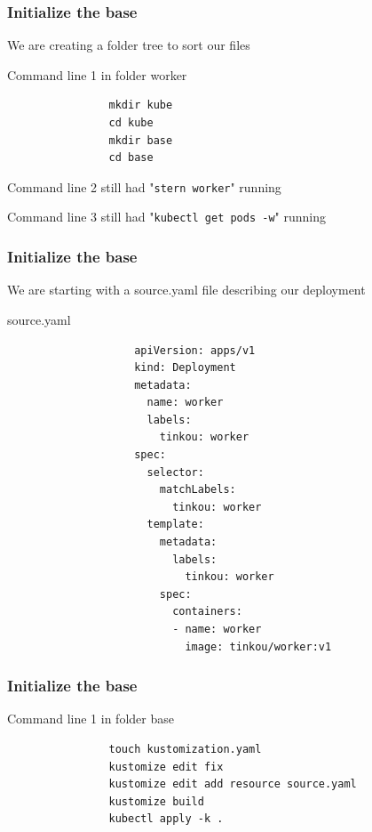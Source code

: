 	\begin{frame}[fragile]
		\frametitle{Initialize the base}
		
		We are creating a folder tree to sort our files
		\begin{block}{Command line 1 in folder worker}
			\begin{verbatim}
				mkdir kube
				cd kube
				mkdir base
				cd base
			\end{verbatim}
		\end{block}
		
		\bigskip
		
		\begin{footnotesize}
			Command line 2 still had "\verb!stern worker!" running
			
			Command line 3 still had "\verb!kubectl get pods -w!" running
		\end{footnotesize}
	\end{frame}
	
	\begin{frame}[fragile]
		\frametitle{Initialize the base}
		
		We are starting with a source.yaml file describing our deployment
		\begin{block}{source.yaml}
			\begin{tiny}
				\begin{verbatim}
					apiVersion: apps/v1
					kind: Deployment
					metadata:
					  name: worker
					  labels:
					    tinkou: worker
					spec:
					  selector:
					    matchLabels:
					      tinkou: worker
					  template:
					    metadata:
					      labels:
					        tinkou: worker
					    spec:
					      containers:
					      - name: worker
					        image: tinkou/worker:v1
				\end{verbatim}
			\end{tiny}
		\end{block}
	\end{frame}
	
	\begin{frame}[fragile]
		\frametitle{Initialize the base}
		\begin{block}{Command line 1 in folder base}
			\begin{verbatim}
				touch kustomization.yaml
				kustomize edit fix
				kustomize edit add resource source.yaml
				kustomize build
				kubectl apply -k .
			\end{verbatim}
		\end{block}
	\end{frame}
	
